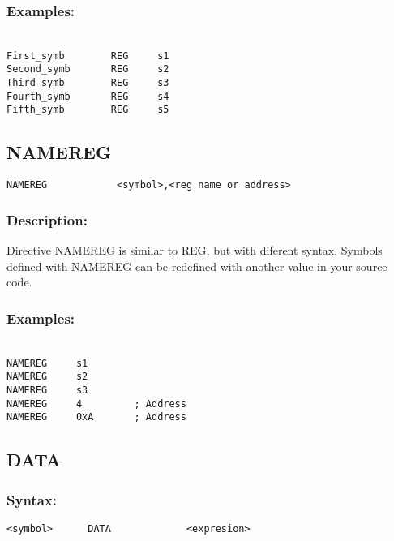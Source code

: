        \subsubsection{Examples:}
            {
            ~\\
            \usecodefont
            \verb'First_symb        REG     s1'\\
            \verb'Second_symb       REG     s2'\\
            \verb'Third_symb        REG     s3'\\
            \verb'Fourth_symb       REG     s4'\\
            \verb'Fifth_symb        REG     s5'\\
            }
            
        \subsection{NAMEREG}
            \verb'NAMEREG            <symbol>,<reg name or address> '
            
        \subsubsection{Description:}
        Directive NAMEREG is similar to REG, but with diferent syntax. Symbols defined with NAMEREG can be redefined with another value in your source
        code.

        \subsubsection{Examples:}
        {
            ~\\
            \usecodefont
            \verb'NAMEREG     s1'\\
            \verb'NAMEREG     s2'\\
            \verb'NAMEREG     s3'\\
            \verb'NAMEREG     4         ; Address'\\
            \verb'NAMEREG     0xA       ; Address'\\
        }


    \subsection{DATA}
        \subsubsection{Syntax:}
            \verb'<symbol>      DATA             <expresion>'
            

